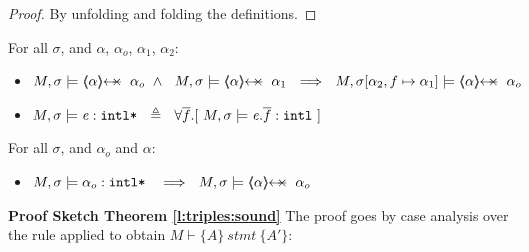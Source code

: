 \begin{proof}
By unfolding and folding the definitions.
\end{proof}

{
 \begin{lemma} For all $\sigma$,  and $\alpha$, $\alpha_o$, $\alpha_1$, $\alpha_2$:
 \label{l:prtFrom}
\begin{itemize}
\item
$ M, \sigma  \models    {\protectedFrom \alpha  {\alpha_o}}  \  \wedge \ \  M, \sigma  \models    {\protectedFrom \alpha  {\alpha_1}}    \   \ 
\Longrightarrow\ \ M, \sigma[\alpha_2,f \mapsto \alpha_1] \models  \protectedFrom\alpha   {\alpha_o}$
\end{itemize}
\end{lemma}
}

{
\begin{definition}
\begin{itemize}
\item
$M, \sigma \models \mathit{e}:\mbox{\normalfont{\texttt{intl*}}} \ \ \triangleq \ \ \forall \overline{f}.[\  M, \sigma \models \mathit{e}.\overline{f}:\mbox{\normalfont{\texttt{intl}}}\ ]$
\end{itemize}
\end{definition}
}

{
 \begin{lemma} For all $\sigma$, and $\alpha_o$ and $\alpha$:
\begin{itemize}
\item
$M, \sigma \models \internalPaths{\alpha_o}  \    \ \ \Longrightarrow\ \ M, \sigma \models {\protectedFrom \alpha {\alpha_o}}$
\end{itemize}
\end{lemma}
}

\noindent
\vspace{.2cm}
\textbf{Proof Sketch Theorem \ref{l:triples:sound}} 
The proof goes by case analysis over the rule applied to obtain $M \vdash \{ A \}\ stmt \  \{ A' \} $:

